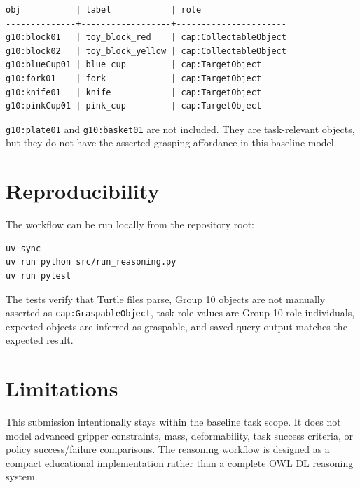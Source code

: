 \documentclass[a4paper, 11pt]{article}
\begin{document}
\begin{lstlisting}
obj           | label            | role
--------------+------------------+----------------------
g10:block01   | toy_block_red    | cap:CollectableObject
g10:block02   | toy_block_yellow | cap:CollectableObject
g10:blueCup01 | blue_cup         | cap:TargetObject
g10:fork01    | fork             | cap:TargetObject
g10:knife01   | knife            | cap:TargetObject
g10:pinkCup01 | pink_cup         | cap:TargetObject
\end{lstlisting}

\texttt{g10:plate01} and \texttt{g10:basket01} are not included. They are task-relevant objects, but they do not have the asserted grasping affordance in this baseline model.

\section{Reproducibility}

The workflow can be run locally from the repository root:

\begin{lstlisting}[language=bash]
uv sync
uv run python src/run_reasoning.py
uv run pytest
\end{lstlisting}

The tests verify that Turtle files parse, Group 10 objects are not manually asserted as \texttt{cap:GraspableObject}, task-role values are Group 10 role individuals, expected objects are inferred as graspable, and saved query output matches the expected result.

\section{Limitations}

This submission intentionally stays within the baseline task scope. It does not model advanced gripper constraints, mass, deformability, task success criteria, or policy success/failure comparisons. The reasoning workflow is designed as a compact educational implementation rather than a complete OWL DL reasoning system.
\end{document}
